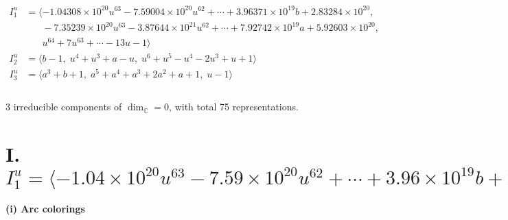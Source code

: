 \documentclass[1p]{elsarticle_modified}
\theoremstyle{definition}
\begin{document}
\begin{align*}
I^u_{1}&=\langle 
-1.04308\times10^{20} u^{63}-7.59004\times10^{20} u^{62}+\cdots+3.96371\times10^{19} b+2.83284\times10^{20},\\
\phantom{I^u_{1}}&\phantom{= \langle  }-7.35239\times10^{20} u^{63}-3.87644\times10^{21} u^{62}+\cdots+7.92742\times10^{19} a+5.92603\times10^{20},\\
\phantom{I^u_{1}}&\phantom{= \langle  }u^{64}+7 u^{63}+\cdots-13 u-1\rangle \\
I^u_{2}&=\langle 
b-1,\;u^4+u^3+a- u,\;u^6+u^5- u^4-2 u^3+u+1\rangle \\
I^u_{3}&=\langle 
a^3+b+1,\;a^5+a^4+a^3+2 a^2+a+1,\;u-1\rangle \\
\\
\end{align*}
\raggedright * 3 irreducible components of $\dim_{\mathbb{C}}=0$, with total 75 representations.\\
\newpage
\renewcommand{\arraystretch}{1}
\centering \section*{I. $I^u_{1}= \langle -1.04\times10^{20} u^{63}-7.59\times10^{20} u^{62}+\cdots+3.96\times10^{19} b+2.83\times10^{20},\;-7.35\times10^{20} u^{63}-3.88\times10^{21} u^{62}+\cdots+7.93\times10^{19} a+5.93\times10^{20},\;u^{64}+7 u^{63}+\cdots-13 u-1 \rangle$}
\flushleft \textbf{(i) Arc colorings}\\
\end{document}
